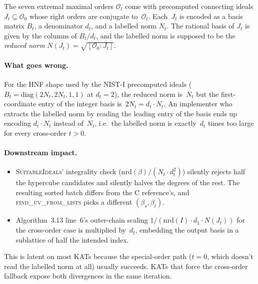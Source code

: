 \documentclass[a4paper,11pt]{article}
\newcommand{\algo}[1]{Algorithm~#1}
\begin{document}
The seven extremal maximal orders $\mathcal{O}_t$ come with
precomputed connecting ideals
$J_t \subseteq \mathcal{O}_0$ whose right orders are conjugate
to~$\mathcal{O}_t$.  Each~$J_t$ is encoded as a basis matrix
$B_t$, a denominator $d_t$, and a labelled norm $N_t$.  The
rational basis of $J_t$ is given by the columns of $B_t / d_t$,
and the labelled norm is supposed to be the
\emph{reduced norm} $N(J_t) = \sqrt{[\mathcal{O}_0 : J_t]}$.

\paragraph{What goes wrong.}
For the HNF shape used by the NIST-I precomputed ideals
($B_t = \mathrm{diag}(2 N_t, 2 N_t, 1, 1)$ at $d_t = 2$), the
reduced norm is~$N_t$ but the first-coordinate entry of the
integer basis is~$2 N_t = d_t \cdot N_t$.  An implementer who
extracts the labelled norm by reading the leading entry of the
basis ends up encoding $d_t \cdot N_t$ instead of~$N_t$,
i.e.\ the labelled norm is exactly~$d_t$ times too large for
every cross-order $t > 0$.

\paragraph{Downstream impact.}
\begin{itemize}
  \item \textsc{SuitableIdeals}' integrality check
    ($\mathrm{nrd}(\beta) / (N_t \cdot d_t^2)$) silently rejects
    half the hypercube candidates and silently halves the
    degrees of the rest.  The resulting sorted batch differs
    from the C reference's, and
    \textsc{find\_uv\_from\_lists} picks a different
    $(\beta_s, \beta_t)$.
  \item \algo{3.13} line~6's outer-chain scaling
    $1/(\mathrm{nrd}(I) \cdot d_1 \cdot N(J_t))$ for the
    cross-order case is multiplied by~$d_t$, embedding the
    output basis in a sublattice of half the intended index.
\end{itemize}
This is latent on most KATs because the special-order path
($t = 0$, which doesn't read the labelled norm at all) usually
succeeds.  KATs that force the cross-order fallback expose
both divergences in the same iteration.
\end{document}
